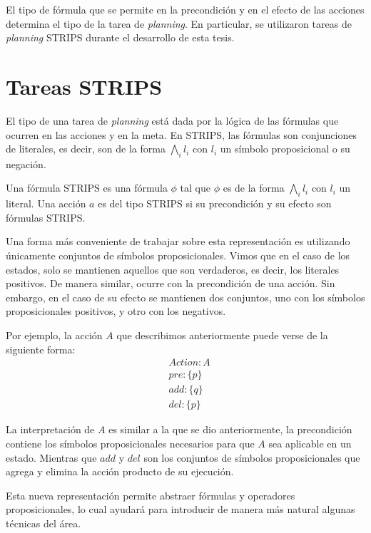 El tipo de fórmula que se permite en la precondición y en el efecto de las
acciones determina el tipo de la tarea de \emph{planning}. En particular, se
utilizaron tareas de \emph{planning} STRIPS durante el desarrollo de esta tesis.

\section{Tareas STRIPS}

El tipo de una tarea de \emph{planning} está dada por la lógica de las fórmulas
que ocurren en las acciones y en la meta. En STRIPS, las fórmulas son
conjunciones de literales, es decir, son de la forma $\bigwedge_i l_i$ con $l_i$
un símbolo proposicional o su negación.

\begin{mydef}
    Una fórmula STRIPS es una fórmula $\phi$ tal que $\phi$ es de la forma
    $\bigwedge_i l_i$ con $l_i$ un literal. Una acción $a$ es del tipo STRIPS si
    su precondición y su efecto son fórmulas STRIPS.
\end{mydef}

Una forma más conveniente de trabajar sobre esta representación es utilizando
únicamente conjuntos de símbolos proposicionales. Vimos que en el caso de los
estados, solo se mantienen aquellos que son verdaderos, es decir, los literales
positivos. De manera similar, ocurre con la precondición de una acción. Sin
embargo, en el caso de su efecto se mantienen dos conjuntos, uno con los
símbolos proposicionales positivos, y otro con los negativos.

Por ejemplo, la acción $A$ que describimos anteriormente puede verse de la
siguiente forma:
\begin{align*}
    & Action : A \\
    & pre : \{ p \}\\
    & add : \{ q \}\\
    & del : \{ p \}
\end{align*}

La interpretación de $A$ es similar a la que se dio anteriormente, la
precondición contiene los símbolos proposicionales necesarios para que $A$ sea
aplicable en un estado. Mientras que $add$ y $del$ son los conjuntos de símbolos
proposicionales que agrega y elimina la acción producto de su ejecución.

Esta nueva representación permite abstraer fórmulas y operadores
proposicionales, lo cual ayudará para introducir de manera más natural algunas
técnicas del área.


